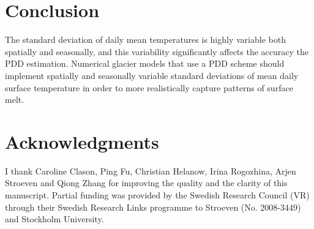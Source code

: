 \documentclass[review]{igs}
\begin{document}

\section{Conclusion}

The standard deviation of daily mean temperatures is highly variable both spatially and seasonally, and this variability significantly affects the accuracy the PDD estimation. Numerical glacier models that use a PDD scheme should implement spatially and seasonally variable standard deviations of mean daily surface temperature in order to more realistically capture patterns of surface melt.


\section{Acknowledgments}

I thank Caroline Clason, Ping Fu, Christian Helanow, Irina Rogozhina, Arjen Stroeven and Qiong Zhang for improving the quality and the clarity of this manuscript. Partial funding was provided by the Swedish Research Council (VR) through their Swedish Research Links programme to Stroeven (No. 2008-3449) and Stockholm University.



\end{document}
